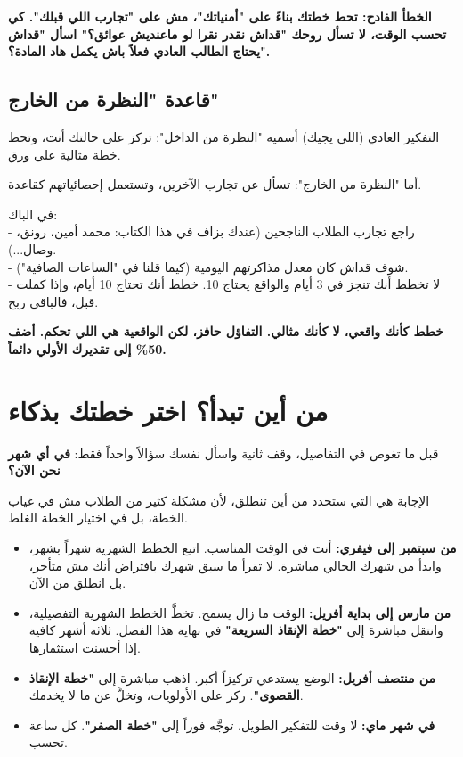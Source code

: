\documentclass[12pt,a4paper]{book}
\newcommand{\importantAr}[1]{%
	\begin{important}
		\bfseries #1
	\end{important}
}
\begin{document}
\importantAr{الخطأ الفادح: تحط خطتك بناءً على "أمنياتك"، مش على "تجارب اللي قبلك". كي تحسب الوقت، لا تسأل روحك "قداش نقدر نقرا لو ماعنديش عوائق؟" اسأل "قداش يحتاج الطالب العادي فعلاً باش يكمل هاد المادة؟".}

\subsection*{قاعدة "النظرة من الخارج"}

التفكير العادي (اللي يجيك) أسميه "النظرة من الداخل": تركز على حالتك أنت، وتحط خطة مثالية على ورق.

أما "النظرة من الخارج": تسأل عن تجارب الآخرين، وتستعمل إحصائياتهم كقاعدة.

في الباك: \\
- راجع تجارب الطلاب الناجحين (عندك بزاف في هذا الكتاب: محمد أمين، رونق، وصال...).\\
- شوف قداش كان معدل مذاكرتهم اليومية (كيما قلنا في "الساعات الصافية").\\
- لا تخطط أنك تنجز في 3 أيام والواقع يحتاج 10. خطط أنك تحتاج 10 أيام، وإذا كملت قبل، فالباقي ربح.

\importantAr{خطط كأنك واقعي، لا كأنك مثالي. التفاؤل حافز، لكن الواقعية هي اللي تحكم. أضف 50\% إلى تقديرك الأولي دائماً.}
	
	\section{من أين تبدأ؟ اختر خطتك بذكاء}
	\label{sec:owner-experiences6}
	
	قبل ما تغوص في التفاصيل، وقف ثانية واسأل نفسك سؤالاً واحداً فقط:
	\textbf{في أي شهر نحن الآن؟}
	
	الإجابة هي التي ستحدد من أين تنطلق، لأن مشكلة كثير من الطلاب
	مش في غياب الخطة، بل في اختيار الخطة الغلط.
	
	\begin{itemize}
		\item \textbf{من سبتمبر إلى فيفري:}
		أنت في الوقت المناسب. اتبع الخطط الشهرية شهراً بشهر،
		وابدأ من شهرك الحالي مباشرة. لا تقرأ ما سبق شهرك بافتراض أنك مش متأخر،
		بل انطلق من الآن.
		
		\item \textbf{من مارس إلى بداية أفريل:}
		الوقت ما زال يسمح. تخطَّ الخطط الشهرية التفصيلية،
		وانتقل مباشرة إلى \textbf{"خطة الإنقاذ السريعة"}
		في نهاية هذا الفصل. ثلاثة أشهر كافية إذا أحسنت استثمارها.
		
		\item \textbf{من منتصف أفريل:}
		الوضع يستدعي تركيزاً أكبر. اذهب مباشرة إلى
		\textbf{"خطة الإنقاذ القصوى"}.
		ركز على الأولويات، وتخلَّ عن ما لا يخدمك.
		
		\item \textbf{في شهر ماي:}
		لا وقت للتفكير الطويل. توجَّه فوراً إلى
		\textbf{"خطة الصفر"}.
		كل ساعة تحسب.
	\end{itemize}
	
\end{document}
